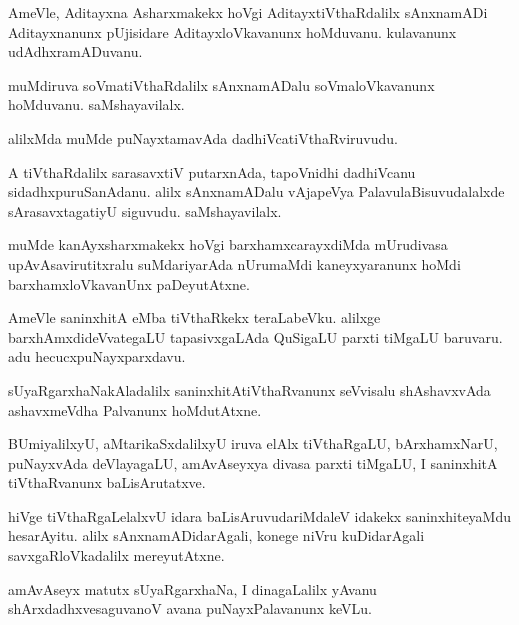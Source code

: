 \documentclass{article}
\begin{document}
\begin{mn}
AmeVle, Aditayxna Asharxmakekx hoVgi AditayxtiVthaRdalilx sAnxnamADi Aditayxnanunx pUjisidare 
AditayxloVkavanunx hoMduvanu. kulavanunx udAdhxramADuvanu. 
\end{mn}

\begin{mn}
muMdiruva soVmatiVthaRdalilx sAnxnamADalu soVmaloVkavanunx hoMduvanu. saMshayavilalx.
\end{mn}

\begin{mn}
alilxMda muMde  puNayxtamavAda dadhiVcatiVthaRviruvudu.
\end{mn}

\begin{mn}
A tiVthaRdalilx sarasavxtiV putarxnAda, tapoVnidhi dadhiVcanu sidadhxpuruSanAdanu. alilx 
sAnxnamADalu vAjapeVya PalavulaBisuvudalalxde sArasavxtagatiyU siguvudu. saMshayavilalx. 
\end{mn}

\begin{mn}
muMde kanAyxsharxmakekx hoVgi barxhamxcarayxdiMda mUrudivasa upAvAsavirutitxralu suMdariyarAda 
nUrumaMdi kaneyxyaranunx hoMdi barxhamxloVkavanUnx paDeyutAtxne.
\end{mn}

\begin{mn}
AmeVle saninxhitA eMba tiVthaRkekx teraLabeVku. alilxge barxhAmxdideVvategaLU tapasivxgaLAda 
QuSigaLU parxti tiMgaLU baruvaru. adu hecucxpuNayxparxdavu.
\end{mn}

\begin{mn}
sUyaRgarxhaNakAladalilx saninxhitAtiVthaRvanunx seVvisalu shAshavxvAda ashavxmeVdha Palvanunx 
hoMdutAtxne.
\end{mn}

\begin{mn}
BUmiyalilxyU, aMtarikaSxdalilxyU iruva elAlx tiVthaRgaLU, bArxhamxNarU, puNayxvAda deVlayagaLU, 
amAvAseyxya divasa parxti tiMgaLU, I saninxhitA tiVthaRvanunx baLisArutatxve. 
\end{mn}

\begin{mn}
hiVge tiVthaRgaLelalxvU idara baLisAruvudariMdaleV idakekx saninxhiteyaMdu hesarAyitu. alilx 
sAnxnamADidarAgali, konege niVru kuDidarAgali savxgaRloVkadalilx mereyutAtxne.
\end{mn}

\begin{mn}
amAvAseyx matutx sUyaRgarxhaNa, I dinagaLalilx yAvanu shArxdadhxvesaguvanoV avana puNayxPalavanunx
keVLu.
\end{mn}
\end{document}

